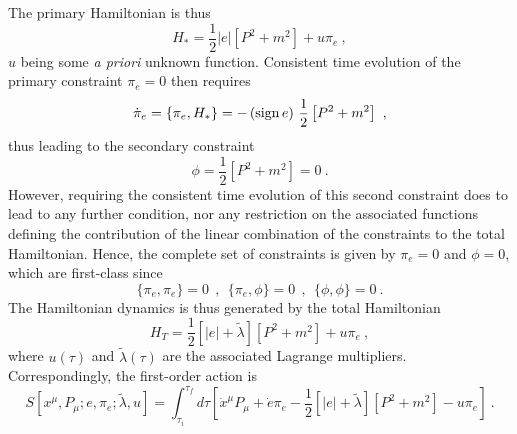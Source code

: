 \documentclass[a4paper,11pt]{article}
\begin{document}
The primary Hamiltonian is thus
\begin{equation}
H_*=\frac{1}{2}|e|\left[P^2+m^2\right]+u\pi_e\ ,
\end{equation}
$u$ being some {\sl a priori\/} unknown function. Consistent time evolution
of the primary constraint $\pi_e=0$ then requires
\begin{equation}
\dot{\pi}_e=\{\pi_e,H_*\}=-\left({\rm sign}\,e\right)\,
\frac{1}{2}\left[P^2+m^2\right]\ ,
\end{equation}
thus leading to the secondary constraint
\begin{equation}
\phi=\frac{1}{2}\left[P^2+m^2\right]=0\ .
\end{equation}
However, requiring the consistent time evolution of this second constraint
does to lead to any further condition, nor any restriction on the associated 
functions defining the contribution of the linear combination of the
constraints to the total Hamiltonian. Hence, the complete set
of constraints is given by $\pi_e=0$ and $\phi=0$, which are first-class since
\begin{equation}
\{\pi_e,\pi_e\}=0\ \ ,\ \ \{\pi_e,\phi\}=0\ \ ,\ \ \{\phi,\phi\}=0\ .
\end{equation}
The Hamiltonian dynamics is thus generated by the total Hamiltonian
\begin{equation}
H_T=\frac{1}{2}\left[|e|+\tilde{\lambda}\right]\left[P^2+m^2\right]+u\pi_e\ ,
\end{equation}
where $u(\tau)$ and $\tilde{\lambda}(\tau)$ are the associated Lagrange
multipliers. Correspon\-ding\-ly, the first-order action is
\begin{equation}
S[x^\mu,P_\mu;e,\pi_e;\tilde{\lambda},u]=\int_{\tau_i}^{\tau_f}d\tau
\left[\dot{x}^\mu P_\mu+\dot{e}\pi_e-\frac{1}{2}\left[|e|+\tilde{\lambda}\right]
\left[P^2+m^2\right]-u\pi_e\right]\ .
\end{equation}
\end{document}
